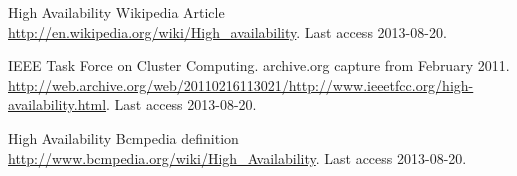 
\begin{thebibliography}{1}


 High Availability Wikipedia Article
\url{http://en.wikipedia.org/wiki/High_availability}. Last access 2013-08-20.

 IEEE Task Force on Cluster Computing. archive.org capture from February 2011.
\url{http://web.archive.org/web/20110216113021/http://www.ieeetfcc.org/high-availability.html}. Last access 2013-08-20.

 High Availability Bcmpedia definition
\url{http://www.bcmpedia.org/wiki/High_Availability}. Last access 2013-08-20.



\end{thebibliography}

